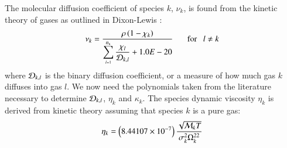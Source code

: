 \documentclass{warpdoc}
\newcommand{\rhos}{\rho}
\newcommand{\ns}{{{n}_{\rm s}}}
\newcommand{\mfa}{\scriptscriptstyle}
\newcommand{\mfd}{\displaystyle}
\begin{document}
%
The molecular diffusion coefficient of species $k$, $\nu_k$,
is found from the kinetic theory of gases as outlined in Dixon-Lewis \cite{gen:dixon-lewis}:
%
\begin{equation}
\mfd\nu_k= \frac{\rhos \left( 1 - {\chi}_k \right)}
            {\mfd\sum_{\mfa l=1}^{\ns} \frac{{\chi}_l}{{\cal D}_{k,l}} +1.0E-20   }
            ~~~~~~~{\rm for}~~~l \neq k
\label{eqn:moldiff-nu}
\end{equation}
%
where ${\cal D}_{k,l}$ is the binary diffusion coefficient, or
a measure of how much gas $k$ diffuses into gas $l$.
We now need the polynomials taken from the literature necessary to determine
${\cal D}_{k,l}$, $\eta_k$ and $\kappa_k$.
The species dynamic viscosity $\eta_k$ is
derived from kinetic theory assuming that species $k$ is a pure gas:
%
\begin{equation}
\eta_k= \left( 8.44107 \times 10^{-7} \right) \frac{  \sqrt{{\cal M}_k T}}
                          {\sigma_k^2 \Omega^{22}_k}
\label{eqn:molvisc-muk1}
\end{equation}
%
%
\end{document}
